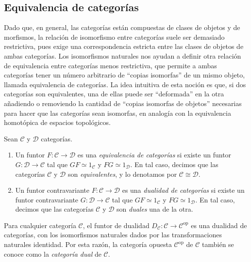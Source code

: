 \documentclass[tesis]{subfiles}
\begin{document}
\subsection*{Equivalencia de categorías} \label{Ssec: Equivalencia de categorías}

Dado que, en general, las categorías están compuestas de clases de objetos y de morfismos, la relación de isomorfismo entre categorías suele ser demasiado restrictiva, pues exige una correspondencia estricta entre las clases de objetos de ambas categorías. Los isomorfismos naturales nos ayudan a definir otra relación de equivalencia entre categorías menos restrictiva, que permite a ambas categorías tener un número arbitrario de ``copias isomorfas'' de un mismo objeto, llamada equivalencia de categorías. La idea intuitiva de esta noción es que, si dos categorías son equivalentes, una de ellas puede ser ``deformada'' en la otra añadiendo o removiendo la cantidad de ``copias isomorfas de objetos'' necesarias para hacer que las categorías sean isomorfas, en analogía con la equivalencia homotópica de espacios topológicos.

\begin{Def}\label{Def: Equivalencia de categorías}
    Sean $\mathscr{C}$ y $\mathscr{D}$ categorías. 

    \begin{enumerate}[label=(\alph*)]
    
        \item Un funtor $F:\mathscr{C}\to \mathscr{D}$ es una \emph{equivalencia de categorías} si existe un funtor $G:\mathscr{D}\to \mathscr{C}$ tal que $GF\simeq1_\mathscr{C}$ y $FG\simeq1_\mathscr{D}$. En tal caso, decimos que las categorías $\mathscr{C}$ y $\mathscr{D}$ son \emph{equivalentes}, y lo denotamos por $\mathscr{C}\cong\mathscr{D}$.

        \item Un funtor contravariante $F:\mathscr{C}\to \mathscr{D}$ es una \emph{dualidad de categorías} si existe un funtor contravariante $G:\mathscr{D}\to \mathscr{C}$ tal que $GF\simeq1_\mathscr{C}$ y $FG\simeq1_\mathscr{D}$. En tal caso, decimos que las categorías $\mathscr{C}$ y $\mathscr{D}$ son \emph{duales} una de la otra. 
    \end{enumerate}
\end{Def}

\begin{Ejem}
    Para cualquier categoría $\mathscr{C}$, el funtor de dualidad $D_\mathscr{C}:\mathscr{C}\to \mathscr{C}^\text{op}$ es una dualidad de categorías, con los isomorfismos naturales dados por las transformaciones naturales identidad. Por esta razón, la categoría opuesta $\mathscr{C}^\text{op}$ de $\mathscr{C}$ también se conoce como la \emph{categoría dual} de $\mathscr{C}$.
\end{Ejem}        
\end{document}
